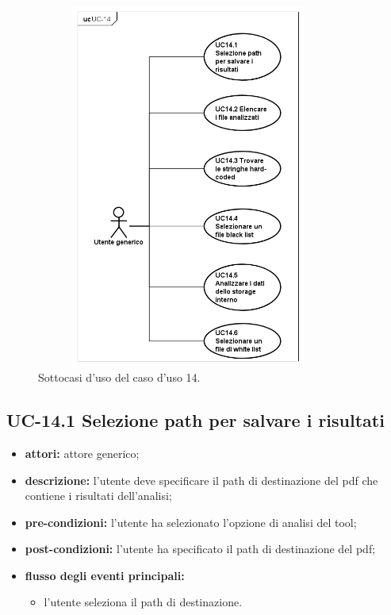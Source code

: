 \begin{figure}[H]
    \centering
    \includegraphics[width=10cm, height=12cm]{./immagini/usecase/subcases_14_1.png}
    \caption{Sottocasi d'uso del caso d'uso 14.}
\end{figure}

\subsection*{UC-14.1 Selezione path per salvare i risultati}
\begin{itemize}
    \item \textbf{attori:} attore generico;
    \item \textbf{descrizione:} l'utente deve specificare il path di destinazione del pdf che contiene i risultati dell'analisi;
    \item \textbf{pre-condizioni:} l'utente ha selezionato l'opzione di analisi del tool;
    \item \textbf{post-condizioni:} l'utente ha specificato il path di destinazione del pdf;
    \item \textbf{flusso degli eventi principali:}
    \begin{itemize}
        \item l'utente seleziona il path di destinazione.
    \end{itemize}
\end{itemize}
